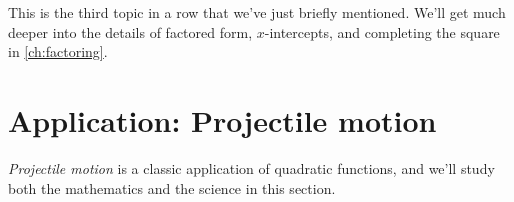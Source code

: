 This is the third topic in a row that we've just briefly mentioned. We'll get much deeper into the details of factored form, $x$-intercepts, and completing the square in \cref{ch:factoring}.












%



%
%
%
%
%
%
%
%
%

\section{Application: Projectile motion}
\label{sec:projectilemotion}

\textit{Projectile motion} is a classic application of quadratic functions, and we'll study both the mathematics and the science in this section.

